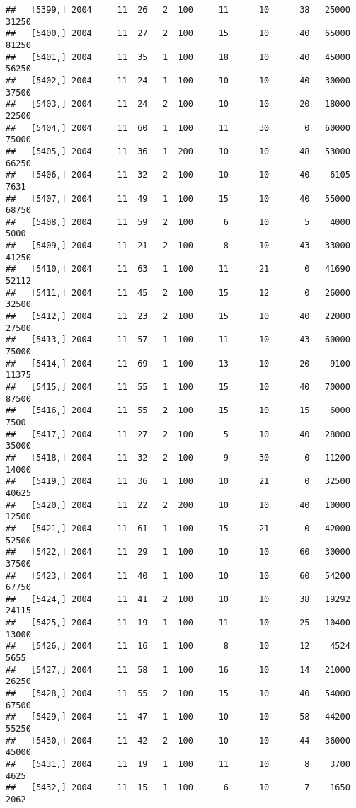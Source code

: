 \documentclass{article}\usepackage[]{graphicx}\usepackage[]{color}
\makeatletter
\newenvironment{kframe}{%
 \def\at@end@of@kframe{}%
 \ifinner\ifhmode%
  \def\at@end@of@kframe{\end{minipage}}%
  \begin{minipage}{\columnwidth}%
 \fi\fi%
 \def\FrameCommand##1{\hskip\@totalleftmargin \hskip-\fboxsep
 \colorbox{shadecolor}{##1}\hskip-\fboxsep
     \hskip-\linewidth \hskip-\@totalleftmargin \hskip\columnwidth}%
 \MakeFramed {\advance\hsize-\width
   \@totalleftmargin\z@ \linewidth\hsize
   \@setminipage}}%
 {\par\unskip\endMakeFramed%
 \at@end@of@kframe}
\newenvironment{knitrout}{}{} %
\makeatother
\begin{document}
\begin{knitrout}
\begin{kframe}
\begin{verbatim}
##   [5399,] 2004     11  26   2  100     11      10      38   25000   31250
##   [5400,] 2004     11  27   2  100     15      10      40   65000   81250
##   [5401,] 2004     11  35   1  100     18      10      40   45000   56250
##   [5402,] 2004     11  24   1  100     10      10      40   30000   37500
##   [5403,] 2004     11  24   2  100     10      10      20   18000   22500
##   [5404,] 2004     11  60   1  100     11      30       0   60000   75000
##   [5405,] 2004     11  36   1  200     10      10      48   53000   66250
##   [5406,] 2004     11  32   2  100     10      10      40    6105    7631
##   [5407,] 2004     11  49   1  100     15      10      40   55000   68750
##   [5408,] 2004     11  59   2  100      6      10       5    4000    5000
##   [5409,] 2004     11  21   2  100      8      10      43   33000   41250
##   [5410,] 2004     11  63   1  100     11      21       0   41690   52112
##   [5411,] 2004     11  45   2  100     15      12       0   26000   32500
##   [5412,] 2004     11  23   2  100     15      10      40   22000   27500
##   [5413,] 2004     11  57   1  100     11      10      43   60000   75000
##   [5414,] 2004     11  69   1  100     13      10      20    9100   11375
##   [5415,] 2004     11  55   1  100     15      10      40   70000   87500
##   [5416,] 2004     11  55   2  100     15      10      15    6000    7500
##   [5417,] 2004     11  27   2  100      5      10      40   28000   35000
##   [5418,] 2004     11  32   2  100      9      30       0   11200   14000
##   [5419,] 2004     11  36   1  100     10      21       0   32500   40625
##   [5420,] 2004     11  22   2  200     10      10      40   10000   12500
##   [5421,] 2004     11  61   1  100     15      21       0   42000   52500
##   [5422,] 2004     11  29   1  100     10      10      60   30000   37500
##   [5423,] 2004     11  40   1  100     10      10      60   54200   67750
##   [5424,] 2004     11  41   2  100     10      10      38   19292   24115
##   [5425,] 2004     11  19   1  100     11      10      25   10400   13000
##   [5426,] 2004     11  16   1  100      8      10      12    4524    5655
##   [5427,] 2004     11  58   1  100     16      10      14   21000   26250
##   [5428,] 2004     11  55   2  100     15      10      40   54000   67500
##   [5429,] 2004     11  47   1  100     10      10      58   44200   55250
##   [5430,] 2004     11  42   2  100     10      10      44   36000   45000
##   [5431,] 2004     11  19   1  100     11      10       8    3700    4625
##   [5432,] 2004     11  15   1  100      6      10       7    1650    2062

\end{verbatim}
\end{kframe}
\end{knitrout}
\end{document}
